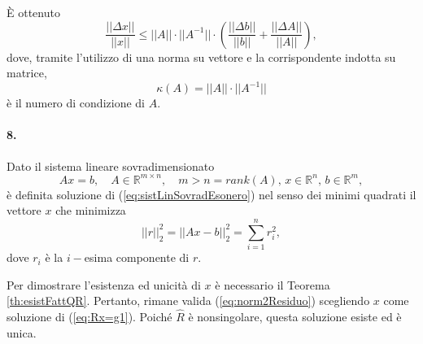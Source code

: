 È ottenuto
\begin{equation*}
    \frac{||\Delta x||}{||x||}\leq ||A||\cdot||A^{-1}||\cdot\left(\frac{||\Delta b||}{||b||} + \frac{||\Delta A||}{||A||}\right),
\end{equation*}
dove, tramite l'utilizzo di una norma su vettore e la corrispondente indotta su matrice,
\begin{equation*}
    \kappa(A)=||A||\cdot ||A^{-1}||
\end{equation*}
è il numero di condizione di $A$.

\paragraph{8.} Dato il sistema lineare sovradimensionato
\begin{equation}\label{eq:sistLinSovradEsonero}
    Ax=b,\quad A\in\mathbb R^{m\times n},\quad m>n=rank(A),\, x\in\mathbb R^n,\, b\in\mathbb R^m,
\end{equation}
è definita soluzione di (\ref{eq:sistLinSovradEsonero}) nel senso dei minimi quadrati il vettore $x$ che minimizza
\begin{equation*}
    ||r||_2^2=||Ax-b||_2^2=\sum_{i=1}^nr_i^2,
\end{equation*}
dove $r_i$ è la $i-$esima componente di $r$.

\noindent Per dimostrare l'esistenza ed unicità di $x$ è necessario il Teorema \ref{th:esistFattQR}. Pertanto, rimane valida (\ref{eq:norm2Residuo}) scegliendo $x$ come soluzione di (\ref{eq:Rx=g1}). Poiché $\widehat R$ è nonsingolare, questa soluzione esiste ed è unica.